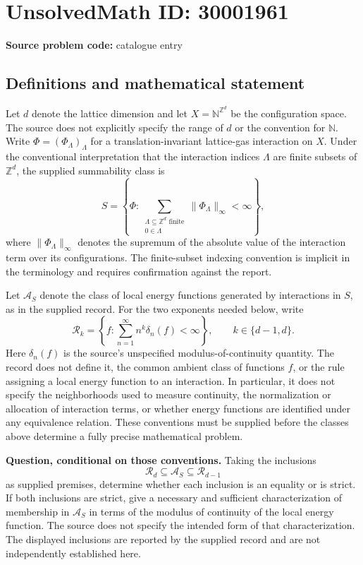 \documentclass[11pt]{article}
\begin{document}
\section*{UnsolvedMath ID: 30001961}
\textbf{Source problem code:} catalogue entry
\subsection{Definitions and mathematical statement}
Let \(d\) denote the lattice dimension and let \(X=\mathbb{N}^{\mathbb{Z}^d}\) be the configuration space. The source does not explicitly specify the range of \(d\) or the convention for \(\mathbb{N}\). Write \(\Phi=(\Phi_\Lambda)_\Lambda\) for a translation-invariant lattice-gas interaction on \(X\). Under the conventional interpretation that the interaction indices \(\Lambda\) are finite subsets of \(\mathbb{Z}^d\), the supplied summability class is
\[
S=\left\{\Phi:\sum_{\substack{\Lambda\subseteq\mathbb{Z}^d\text{ finite}\\0\in\Lambda}}\lVert\Phi_\Lambda\rVert_\infty<\infty\right\},
\]
where \(\lVert\Phi_\Lambda\rVert_\infty\) denotes the supremum of the absolute value of the interaction term over its configurations. The finite-subset indexing convention is implicit in the terminology and requires confirmation against the report.

Let \(\mathcal{A}_S\) denote the class of local energy functions generated by interactions in \(S\), as in the supplied record. For the two exponents needed below, write
\[
\mathcal{R}_k=\left\{f:\sum_{n=1}^{\infty}n^k\delta_n(f)<\infty\right\},\qquad k\in\{d-1,d\}.
\]
Here \(\delta_n(f)\) is the source's unspecified modulus-of-continuity quantity. The record does not define it, the common ambient class of functions \(f\), or the rule assigning a local energy function to an interaction. In particular, it does not specify the neighborhoods used to measure continuity, the normalization or allocation of interaction terms, or whether energy functions are identified under any equivalence relation. These conventions must be supplied before the classes above determine a fully precise mathematical problem.

\textbf{Question, conditional on those conventions.} Taking the inclusions
\[
\mathcal{R}_d\subseteq\mathcal{A}_S\subseteq\mathcal{R}_{d-1}
\]
as supplied premises, determine whether each inclusion is an equality or is strict. If both inclusions are strict, give a necessary and sufficient characterization of membership in \(\mathcal{A}_S\) in terms of the modulus of continuity of the local energy function. The source does not specify the intended form of that characterization. The displayed inclusions are reported by the supplied record and are not independently established here.
\end{document}
